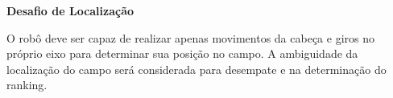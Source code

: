 \clearpage
\sffamily
{\bfseries\color[rgb]{0.4,0.4,0.4}Desafio de Localização}
{}

\bigskip

O robô deve ser capaz de realizar apenas movimentos da cabeça e giros no próprio eixo para determinar sua posição no campo. A ambiguidade da localização do campo será considerada para desempate e na determinação do ranking.